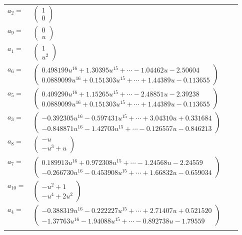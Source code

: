 \documentclass[1p]{elsarticle_modified}
\theoremstyle{definition}
\begin{document}
\begin{tabular}{m{7pt} m{180pt} m{7pt} m{180pt} }
\flushright $a_{2}=$&$\begin{pmatrix}1\\0\end{pmatrix}$ \\
\flushright $a_{9}=$&$\begin{pmatrix}0\\u\end{pmatrix}$ \\
\flushright $a_{1}=$&$\begin{pmatrix}1\\u^2\end{pmatrix}$ \\
\flushright $a_{6}=$&$\begin{pmatrix}0.498199 u^{16}+1.30395 u^{15}+\cdots-1.04462 u-2.50604\\0.0889099 u^{16}+0.151303 u^{15}+\cdots+1.44389 u-0.113655\end{pmatrix}$ \\
\flushright $a_{5}=$&$\begin{pmatrix}0.409290 u^{16}+1.15265 u^{15}+\cdots-2.48851 u-2.39238\\0.0889099 u^{16}+0.151303 u^{15}+\cdots+1.44389 u-0.113655\end{pmatrix}$ \\
\flushright $a_{3}=$&$\begin{pmatrix}-0.392305 u^{16}-0.597431 u^{15}+\cdots+3.04310 u+0.331684\\-0.848871 u^{16}-1.42703 u^{15}+\cdots-0.126557 u-0.846213\end{pmatrix}$ \\
\flushright $a_{8}=$&$\begin{pmatrix}- u\\- u^3+u\end{pmatrix}$ \\
\flushright $a_{7}=$&$\begin{pmatrix}0.189913 u^{16}+0.972308 u^{15}+\cdots-1.24568 u-2.24559\\-0.266730 u^{16}-0.453908 u^{15}+\cdots+1.66832 u-0.659034\end{pmatrix}$ \\
\flushright $a_{10}=$&$\begin{pmatrix}- u^2+1\\- u^4+2 u^2\end{pmatrix}$ \\
\flushright $a_{4}=$&$\begin{pmatrix}-0.388319 u^{16}-0.222227 u^{15}+\cdots+2.71407 u+0.521520\\-1.37763 u^{16}-1.94088 u^{15}+\cdots-0.892738 u-1.79559\end{pmatrix}$\\&\end{tabular}
\end{document}
